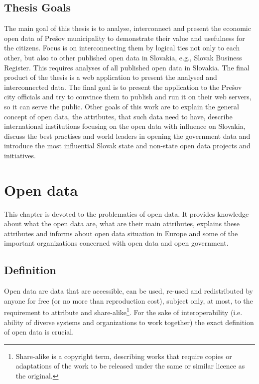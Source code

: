 \documentclass[thesis=B,english]{FITthesis}[2012/06/26]
\begin{document}
\begin{introduction}
	\section*{Thesis Goals}
	The main goal of this thesis is to analyse, interconnect and present the economic open data of Prešov municipality to demonstrate their value and usefulness for the citizens. Focus is on interconnecting them by logical ties not only to each other, but also to other published open data in Slovakia, e.g., Slovak Business Register. This requires analyses of all published open data in Slovakia. The final product of the thesis is a web application to present the analysed and interconnected data. The final goal is to present the application to the Prešov city officials and try to convince them to publish and run it on their web servers, so it can serve the public. Other goals of this work are to explain the general concept of open data, the attributes, that such data need to have, describe international institutions focusing on the open data with influence on Slovakia, discuss the best practises and world leaders in opening the government data and introduce the most influential Slovak state and non-state open data projects and initiatives.

\end{introduction}

\chapter{Open data}
	This chapter is devoted to the problematics of open data. It provides knowledge about what the open data are, what are their main attributes, explains these attributes and informs about open data situation in Europe and some of the important organizations concerned with open data and open government.
	\section{Definition}
	Open data are data that are accessible, can be used, re-used and redistributed by anyone for free (or no more than reproduction cost), subject only, at most, to the requirement to attribute and share-alike\footnote{Share-alike is a copyright term, describing works that require copies or adaptations of the work to be released under the same or similar licence as the original.}. For the sake of interoperability (i.e. ability of diverse systems and organizations to work together) the exact definition of open data is crucial. \cite{opendatahandbook} 
\end{document}
